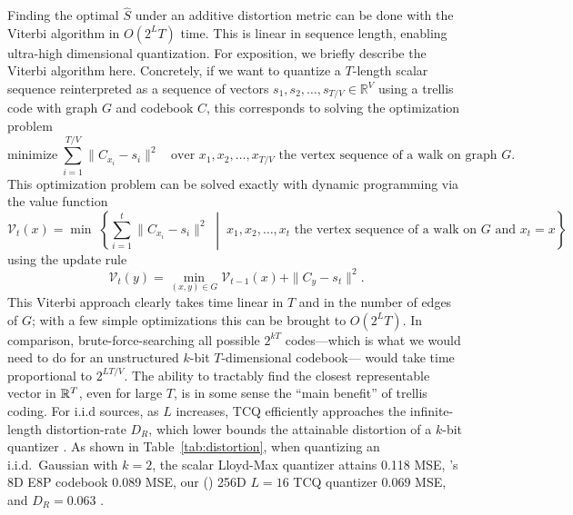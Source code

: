 Finding the optimal $\hat S$ under an additive distortion metric can be done with the Viterbi algorithm in $O(2^LT)$ time.
This is linear in sequence length, enabling ultra-high dimensional quantization.
For exposition, we briefly describe the Viterbi algorithm here. Concretely, if we want to quantize a $T$-length scalar sequence reinterpreted as a sequence of vectors $s_1, s_2, \ldots, s_{T/V} \in \mathbb{R}^V$ using a trellis code with graph $G$ and codebook $C$, this corresponds to solving the optimization problem
\[
    \mbox{minimize} \; \sum_{i=1}^{T/V} \| C_{x_i} - s_i \|^2 \; \; \mbox{ over } x_1, x_2, \ldots, x_{T/V} \mbox{ the vertex sequence of a walk on graph } G.
\]
This optimization problem can be solved exactly with dynamic programming via the value function
\[
    \mathcal{V}_t(x) = \min \; \left\{ \sum_{i=1}^t \| C_{x_i} - s_i \|^2 \; \middle| \; x_1, x_2, \ldots, x_t \mbox{ the vertex sequence of a walk on } G \mbox{ and } x_t = x \right \}
\]
using the update rule
\[
    \mathcal{V}_t(y) = \min_{(x,y) \in G} \mathcal{V}_{t-1}(x) +  \| C_y - s_t \|^2.
\]
This Viterbi approach clearly takes time linear in $T$ and in the number of edges of $G$; with a few simple optimizations this can be brought to $O(2^L T)$. In comparison, brute-force-searching all possible $2^{kT}$ codes---which is what we would need to do for an unstructured $k$-bit $T$-dimensional codebook--- would take time proportional to $2^{LT/V}$. The ability to tractably find the closest representable vector in $\mathbb{R}^T$, even for large $T$, is in some sense the ``main benefit'' of trellis coding.
For i.i.d sources, as $L$ increases, TCQ efficiently approaches the infinite-length distortion-rate $D_R$, which lower bounds the attainable distortion of a $k$-bit quantizer \cite{6145679}.
As shown in Table~\ref{tab:distortion}, when quantizing an i.i.d.\ Gaussian with $k=2$, the scalar Lloyd-Max quantizer attains 0.118 MSE, \qs's 8D E8P codebook 0.089 MSE, our (\qt) 256D $L=16$ TCQ quantizer 0.069 MSE, and $D_R = 0.063$ \cite{lloyd1982least,1057548,tseng2024quip,10.5555/1146355}. 



